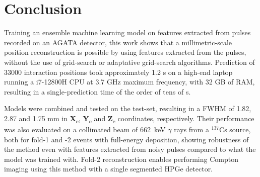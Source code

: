 

\section{Conclusion}
Training an ensemble machine learning model on features extracted from pulses recorded on an AGATA detector, this work shows that a millimetric-scale position reconstruction is possible by using features extracted from the pulses, without the use of grid-search or adaptative grid-search algorithms. Prediction of 33000 interaction positions took approximately 1.2 s on a high-end laptop running a i7-12800H CPU at 3.7 GHz maximum frequency, with 32 GB of RAM, resulting in a single-prediction time of the order of tens of \textmu s.

Models were combined and tested on the test-set, resulting in a FWHM of 1.82, 2.87 and 1.75 mm in \textbf{X}\textsubscript{c}, \textbf{Y}\textsubscript{c} and \textbf{Z}\textsubscript{c} coordinates, respectively. Their performance was also evaluated on a collimated beam of 662~keV $\gamma$ rays from a $^{137}$Cs source, both for fold-1 and -2 events with full-energy deposition, showing robustness of the method even with features extracted from noisy pulses compared to what the model was trained with. Fold-2 reconstruction enables performing Compton imaging using this method with a single segmented HPGe detector.

%
%
